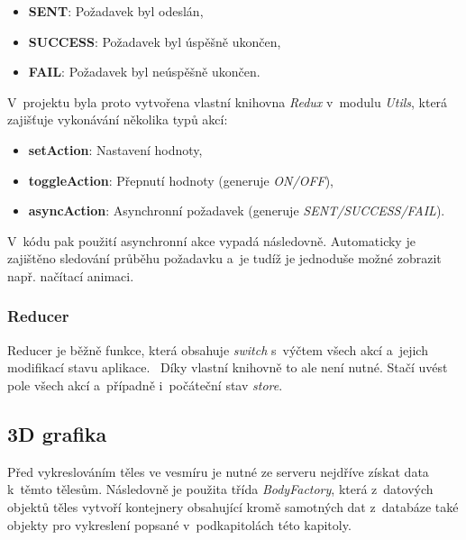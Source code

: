 \documentclass[a4paper,12pt]{article}
\begin{document}
\begin{itemize}
\item \textbf{SENT}: Požadavek byl odeslán,
\item \textbf{SUCCESS}: Požadavek byl úspěšně ukončen,
\item \textbf{FAIL}: Požadavek byl neúspěšně ukončen.
\end{itemize}

V~projektu byla proto vytvořena vlastní knihovna \textit{Redux} v~modulu \textit{Utils}, která zajišťuje vykonávání několika typů akcí:

\begin{itemize}
\item \textbf{setAction}: Nastavení hodnoty,
\item \textbf{toggleAction}: Přepnutí hodnoty (generuje \textit{ON/OFF}),
\item \textbf{asyncAction}: Asynchronní požadavek (generuje \textit{SENT/SUCCESS/FAIL}).
\end{itemize}

V~kódu pak použití asynchronní akce vypadá následovně. Automaticky je zajištěno sledování průběhu požadavku a~je tudíž je jednoduše možné zobrazit např. načítací animaci.



\subsubsection{Reducer}

Reducer je běžně funkce, která obsahuje \textit{switch} s~výčtem všech akcí a~jejich modifikací stavu aplikace.~\cite{reactbook} Díky vlastní knihovně to ale není nutné. Stačí uvést pole všech akcí a~případně i~počáteční stav \textit{store}.



\subsection{3D grafika}

Před vykreslováním těles ve vesmíru je nutné ze serveru nejdříve získat data k~těmto tělesům. Následovně je použita třída \textit{BodyFactory}, která z~datových objektů těles vytvoří kontejnery obsahující kromě samotných dat z~databáze také objekty pro vykreslení popsané v~podkapitolách této kapitoly.
\end{document}
